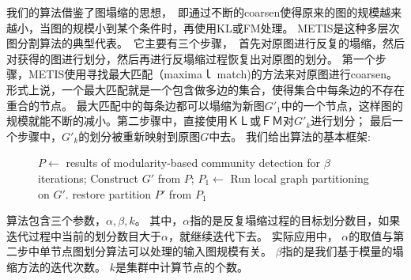 \documentclass[master]{njuthesis}
\begin{document}
我们的算法借鉴了图塌缩的思想，　即通过不断的coarsen使得原来的图的规模越来越小，当图的规模小到某个条件时，再使用KL或FM处理。
METIS是这种多层次图分割算法的典型代表。　它主要有三个步骤，　首先对原图进行反复的塌缩，然后对获得的图进行划分，然后再进行反塌缩过程恢复出对原图的划分。
第一个步骤，METIS使用寻找最大匹配（maximaｌ match)的方法来对原图进行coarsen。形式上说，一个最大匹配就是一个包含做多边的集合，使得集合中每条边的不存在重合的节点。
最大匹配中的每条边都可以塌缩为新图$G\prime_1$中的一个节点，这样图的规模就能不断的减小。第二步骤中，直接使用ＫＬ或ＦＭ对$G\prime_k$进行划分；
最后一个步骤中，$G\prime_k$的划分被重新映射到原图$G$中去。
我们给出算法的基本框架:
\begin{figure}
\begin{algorithm}[H]
\label{alg:mlgp}
\begin{algorithmic}[1]
		\State $P \gets $ results of modularity-based community detection for $\beta$ iterations;
		\State Construct $G\prime$ from $P$; 
	\EndWhile  
	\State $P_1 \gets $ Run local graph partitioning on $G\prime$. 
	\State restore partition $P\prime$ from $P_1$ 
\EndProcedure
\end{algorithmic}
\end{algorithm}
\end{figure}
算法包含三个参数，$\alpha, \beta, k$。
其中，$\alpha$指的是反复塌缩过程的目标划分数目，如果迭代过程中当前的划分数目大于$\alpha$，就继续迭代下去。
实际应用中， $\alpha$的取值与第二步中单节点图划分算法可以处理的输入图规模有关。
$\beta$指的是我们基于模量的塌缩方法的迭代次数。
$k$是集群中计算节点的个数。
\end{document}
